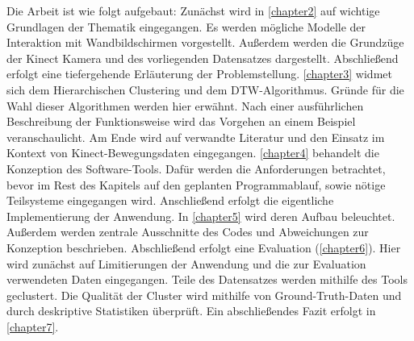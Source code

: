 Die Arbeit ist wie folgt aufgebaut:
Zunächst wird in \autoref{chapter2} auf wichtige Grundlagen der Thematik eingegangen.
Es werden mögliche Modelle der Interaktion mit Wandbildschirmen vorgestellt.
Außerdem werden die Grundzüge der Kinect Kamera und des vorliegenden Datensatzes dargestellt.
Abschließend erfolgt eine tiefergehende Erläuterung der Problemstellung.
\autoref{chapter3} widmet sich dem Hierarchischen Clustering und dem \ac*{DTW}-Algorithmus.
Gründe für die Wahl dieser Algorithmen werden hier erwähnt.
Nach einer ausführlichen Beschreibung der Funktionsweise
wird das Vorgehen an einem Beispiel veranschaulicht.
Am Ende wird auf verwandte Literatur
und den Einsatz im Kontext von Kinect-Bewegungsdaten eingegangen.
\autoref{chapter4} behandelt die Konzeption des Software-Tools.
Dafür werden die Anforderungen betrachtet,
bevor im Rest des Kapitels auf den geplanten Programmablauf,
sowie nötige Teilsysteme eingegangen wird.
Anschließend erfolgt die eigentliche Implementierung der Anwendung.
In \autoref{chapter5} wird deren Aufbau beleuchtet.
Außerdem werden zentrale Ausschnitte des Codes
und Abweichungen zur Konzeption beschrieben.
Abschließend erfolgt eine Evaluation (\autoref{chapter6}).
Hier wird zunächst auf Limitierungen der Anwendung
und die zur Evaluation verwendeten Daten eingegangen.
Teile des Datensatzes werden mithilfe des Tools geclustert.
Die Qualität der Cluster wird mithilfe von Ground-Truth-Daten
und durch deskriptive Statistiken überprüft.
Ein abschließendes Fazit erfolgt in \autoref{chapter7}.